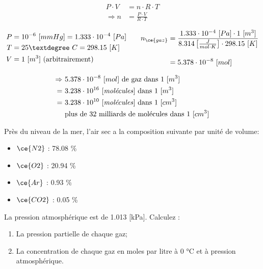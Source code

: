 \documentclass[
  11pt,
  a4paper,
  openany]{book}
\providecommand{\tightlist}{%
  \setlength{\itemsep}{0pt}\setlength{\parskip}{0pt}}
\begin{document}
\begin{Answer}
\[
\begin{split}
    P \cdot V &= n \cdot R \cdot T \\
    \Rightarrow n &= \frac{P \cdot V}{R \cdot T}
\end{split}
\]

\[
\begin{split}
    P &= 10^{-6}\ [mmHg] = 1.333 \cdot 10^{-4}\ [Pa] \\
    T &= 25°\ C = 298.15\ [K] \\
    V &= 1\ [m^3] \text{ (arbitrairement)}
\end{split}
\qquad
\begin{split}
    n_{\ce{gaz}} &= \frac{1.333 \cdot 10^{-4}\ [Pa] \cdot 1\ [m^3]}{8.314 \left[\frac{J}{mol \cdot K}\right] \cdot 298.15\ [K]} \\[1em]
    & = 5.378 \cdot 10^{-8}\ [mol]
\end{split}
\]

\[
\begin{split}
    \Rightarrow\ & 5.378 \cdot 10^{-8}\ [mol] \text{ de gaz dans 1 [$m^3$]} \\
    =\ & 3.238 \cdot 10^{16} \text{ [\textit{molécules}] dans 1 [$m^3$]} \\
    =\ & 3.238 \cdot 10^{10} \text{ [\textit{molécules}] dans 1 [$cm^3$]} \\
    & \text{plus de 32 milliards de molécules dans 1 [$cm^3$]}
\end{split}
\]

\end{Answer}

\begin{Exercise}

Près du niveau de la mer, l'air sec a la composition suivante par unité de volume:

\begin{itemize}
\tightlist
\item
  \(\ce{N2}\) : 78.08 \%
\item
  \(\ce{O2}\) : 20.94 \%
\item
  \(\ce{Ar}\) : 0.93 \%
\item
  \(\ce{CO2}\) : 0.05 \%
\end{itemize}

La pression atmosphérique est de 1.013 {[}kPa{]}. Calculez :

\begin{enumerate}
\def\labelenumi{\alph{enumi}.}
\tightlist
\item
  La pression partielle de chaque gaz;
\item
  La concentration de chaque gaz en moles par litre à 0 °C et à pression atmosphérique.
\end{enumerate}

\end{Exercise}
\end{document}
